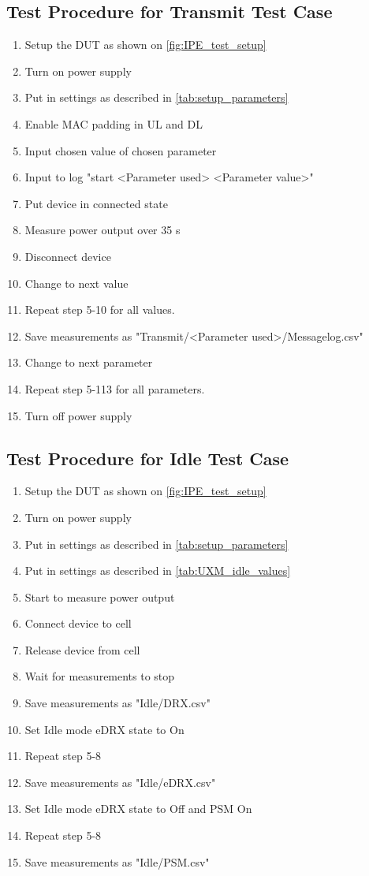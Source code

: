 \subsection{Test Procedure for Transmit Test Case}
\begin{enumerate}
\item Setup the \gls{DUT} as shown on \autoref{fig:IPE_test_setup}
\item Turn on power supply 
\item Put in settings as described in \autoref{tab:setup_parameters} 
\item Enable MAC padding in UL and DL
\item Input chosen value of chosen parameter
\item Input to log "start <Parameter used> <Parameter value>"
\item Put device in connected state
\item Measure power output over 35 s
\item Disconnect device
\item Change to next value
\item Repeat step 5-10 for all values.
\item Save measurements as "Transmit/<Parameter used>/Messagelog.csv"
\item Change to next parameter
\item Repeat step 5-113 for all parameters.
\item Turn off power supply
\end{enumerate}

\subsection{Test Procedure for Idle Test Case}
\begin{enumerate}
\item Setup the \gls{DUT} as shown on \autoref{fig:IPE_test_setup}
\item Turn on power supply 
\item Put in settings as described in \autoref{tab:setup_parameters}
\item Put in settings as described in \autoref{tab:UXM_idle_values}  
\item Start to measure power output
\item Connect device to cell
\item Release device from cell
\item Wait for measurements to stop
\item Save measurements as "Idle/DRX.csv"
\item Set Idle mode eDRX state to On
\item Repeat step 5-8
\item Save measurements as "Idle/eDRX.csv"
\item Set Idle mode eDRX state to Off and PSM On
\item Repeat step 5-8
\item Save measurements as "Idle/PSM.csv"
\end{enumerate}